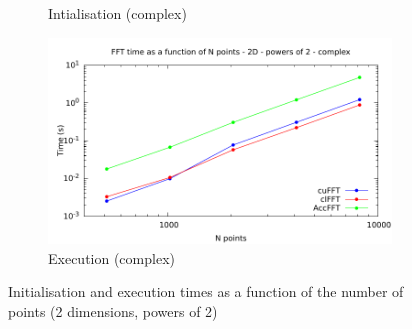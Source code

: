 \documentclass[12pt, a4paper]{article}
\begin{document}
\begin{figure}[H]
\begin{subfigure}{.5\textwidth}
\caption{Intialisation (complex)}
\label{FFTPOW22DCI}
\end{subfigure}%
\begin{subfigure}{.5\textwidth}
\centering
\includegraphics[width=.9\linewidth]{graphs/fft-2d-pow2-c-exec.pdf}
\caption{Execution (complex)}
\label{FFTPOW22DCE}
\end{subfigure}
\caption{Initialisation and execution times as a function of the number of points (2 dimensions, powers of 2)}
\label{FFTPOW22D}
\end{figure}
\end{document}
